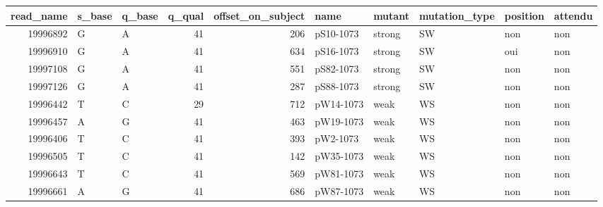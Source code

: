 
\begin{tabular}{r|l|l|r|r|l|l|l|l|l}
\hline
read\_name & s\_base & q\_base & q\_qual & offset\_on\_subject & name & mutant & mutation\_type & position & attendu\\
\hline
19996892 & G & A & 41 & 206 & pS10-1073 & strong & SW & non & non\\
\hline
19996910 & G & A & 41 & 634 & pS16-1073 & strong & SW & oui & non\\
\hline
19997108 & G & A & 41 & 551 & pS82-1073 & strong & SW & non & non\\
\hline
19997126 & G & A & 41 & 287 & pS88-1073 & strong & SW & non & non\\
\hline
19996442 & T & C & 29 & 712 & pW14-1073 & weak & WS & non & non\\
\hline
19996457 & A & G & 41 & 463 & pW19-1073 & weak & WS & non & non\\
\hline
19996406 & T & C & 41 & 393 & pW2-1073 & weak & WS & non & non\\
\hline
19996505 & T & C & 41 & 142 & pW35-1073 & weak & WS & non & non\\
\hline
19996643 & T & C & 41 & 569 & pW81-1073 & weak & WS & non & non\\
\hline
19996661 & A & G & 41 & 686 & pW87-1073 & weak & WS & non & non\\
\hline
\end{tabular}
